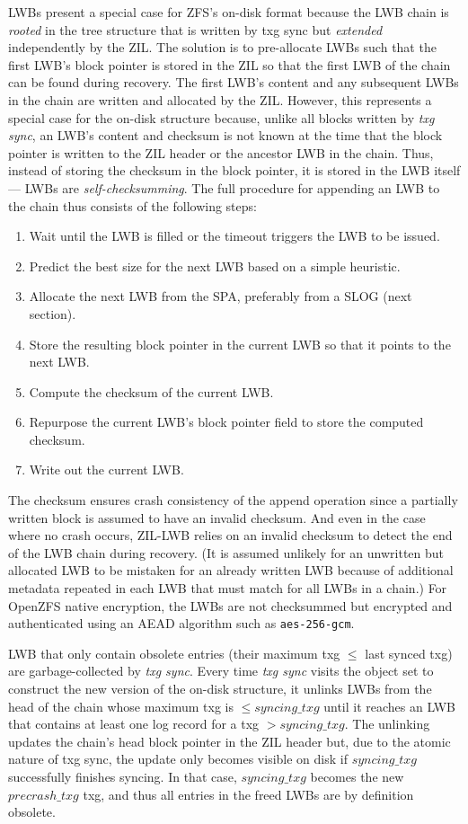 \documentclass[12pt,a4paper,twoside]{book}
\begin{document}
{LWBs present a special case for ZFS's on-disk format because the LWB chain is \textit{rooted} in the tree structure that is written by txg sync but \textit{extended} independently by the ZIL.
The solution is to pre-allocate LWBs such that the first LWB's block pointer is stored in the ZIL so that the first LWB of the chain can be found during recovery.
The first LWB's content and any subsequent LWBs in the chain are written and allocated by the ZIL.
However, this represents a special case for the on-disk structure because, unlike all blocks written by \textit{txg sync}, an LWB's content and checksum is not known at the time that the block pointer is written to the ZIL header or the ancestor LWB in the chain.
Thus, instead of storing the checksum in the block pointer, it is stored in the LWB itself --- LWBs are \textit{self-checksumming}.
The full procedure for appending an LWB to the chain thus consists of the following steps:
\begin{enumerate}[noitemsep]
    \item Wait until the LWB is filled or the timeout triggers the LWB to be issued.
    \item Predict the best size for the next LWB based on a simple heuristic.
    \item Allocate the next LWB from the SPA, preferably from a SLOG (next section).
    \item Store the resulting block pointer in the current LWB so that it points to the next LWB.
    \item Compute the checksum of the current LWB.
    \item Repurpose the current LWB's block pointer field to store the computed checksum.
    \item Write out the current LWB.
\end{enumerate}
The checksum ensures crash consistency of the append operation since a partially written block is assumed to have an invalid checksum.
And even in the case where no crash occurs, ZIL-LWB relies on an invalid checksum to detect the end of the LWB chain during recovery.
(It is assumed unlikely for an unwritten but allocated LWB to be mistaken for an already written LWB because of additional metadata repeated in each LWB that must match for all LWBs in a chain.)
For OpenZFS native encryption, the LWBs are not checksummed but encrypted and authenticated using an AEAD algorithm such as \lstinline{aes-256-gcm}.

LWB that only contain obsolete entries (their maximum txg $\le$ last synced txg) are garbage-collected by \textit{txg sync}.
Every time \textit{txg sync} visits the object set to construct the new version of the on-disk structure, it unlinks LWBs from the head of the chain whose maximum txg is $\le syncing\_txg$ until it reaches an LWB that contains at least one log record for a txg $> syncing\_txg$.
The unlinking updates the chain's head block pointer in the ZIL header but, due to the atomic nature of txg sync, the update only becomes visible on disk if $syncing\_txg$ successfully finishes syncing.
In that case, $syncing\_txg$ becomes the new $precrash\_txg$ txg, and thus all entries in the freed LWBs are by definition obsolete.

}
\end{document}
